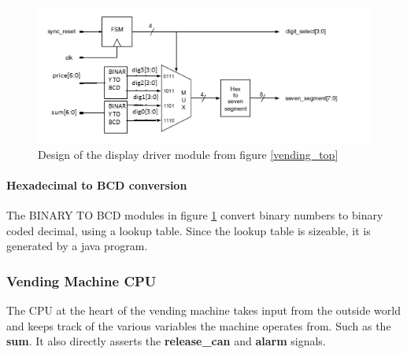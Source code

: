 \begin{figure}
    \center
    \includegraphics{pictures/display_sch.png}
    \caption{Design of the display driver module from figure \ref{vending_top}}
    \label{display_sch}
\end{figure}

\paragraph{Hexadecimal to BCD conversion}
The BINARY TO BCD modules in figure \ref{display_sch} convert binary numbers to binary coded decimal, using a lookup table.
Since the lookup table is sizeable, it is generated by a java program.
\subsubsection{Vending Machine CPU}
The CPU at the heart of the vending machine takes input from the outside world and keeps track of the various variables the machine operates from. 
Such as the \textbf{sum}. It also directly asserts the \textbf{release\_can} and \textbf{alarm} signals. 

